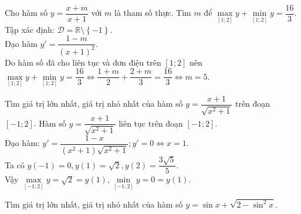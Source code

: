 \begin{vd}%
	Cho hàm số $y=\dfrac{x+m}{x+1}$ với $m$ là tham số thực. Tìm $m$ để $\max\limits_{\left[1;2\right]}y+\min\limits_{\left[1;2\right]}y=\dfrac{16}{3}$.
	\loigiai
	{
		Tập xác định: $\mathscr{D}=\mathbb{R}\setminus\left\{-1\right\}$.\\Đạo hàm $y'=\dfrac{1-m}{(x+1)^2}$.\\Do hàm số đã cho liên tục và đơn điệu trên $\left[1;2\right]$ nên $\max\limits_{\left[1;2\right]}y+\min\limits_{\left[1;2\right]}y=\dfrac{16}{3}\Leftrightarrow\dfrac{1+m}{2}+\dfrac{2+m}{3}=\dfrac{16}{3}\Leftrightarrow m=5$.
	}
\end{vd}

\begin{vd}%
	Tìm giá trị lớn nhất, giá trị nhỏ nhất của hàm số $y=\dfrac{x+1}{\sqrt{x^2+1}}$ trên đoạn $\left[-1;2\right]$.
	\loigiai
	{
		Hàm số $y=\dfrac{x+1}{\sqrt{x^2+1}}$ liên tục trên đoạn $\left[-1;2\right]$.\\Đạo hàm: $y'=\dfrac{1-x}{\left(x^2+1\right)\sqrt{x^2+1}}; y'=0\Leftrightarrow x=1$.\\Ta có $y(-1)=0, y(1)=\sqrt{2}, y(2)=\dfrac{3\sqrt{5}}{5}$.\\Vậy $\max\limits_{\left[-1;2\right]}y=\sqrt{2}=y(1), \min\limits_{\left[-1;2\right]}y=0=y(1)$.
	}
\end{vd}

\begin{vd}%
	Tìm giá trị lớn nhất, giá trị nhỏ nhất của hàm số $y=\sin x+\sqrt{2-\sin^2x}$.
\end{vd}

